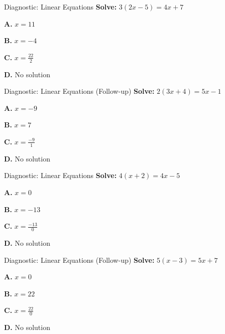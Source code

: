 \documentclass[12pt]{beamer}
\begin{document}
\begin{frame}{Diagnostic: Linear Equations}
\textbf{Solve:} $3(2x - 5) = 4x + 7$

\vspace{1cm}

\textbf{A.} $x = 11$ \hfill {}

\textbf{B.} $x = -4$

\textbf{C.} $x = \displaystyle\frac{22}{2}$

\textbf{D.} No solution
\end{frame}

\begin{frame}{Diagnostic: Linear Equations (Follow-up)}
\textbf{Solve:} $2(3x + 4) = 5x - 1$

\vspace{1cm}

\textbf{A.} $x = -9$ \hfill {}

\textbf{B.} $x = 7$

\textbf{C.} $x = \displaystyle\frac{-9}{1}$

\textbf{D.} No solution
\end{frame}

\begin{frame}{Diagnostic: Linear Equations}
\textbf{Solve:} $4(x + 2) = 4x - 5$

\vspace{1cm}

\textbf{A.} $x = 0$

\textbf{B.} $x = -13$

\textbf{C.} $x = \displaystyle\frac{-13}{0}$

\textbf{D.} No solution \hfill {}
\end{frame}

\begin{frame}{Diagnostic: Linear Equations (Follow-up)}
\textbf{Solve:} $5(x - 3) = 5x + 7$

\vspace{1cm}

\textbf{A.} $x = 0$

\textbf{B.} $x = 22$

\textbf{C.} $x = \displaystyle\frac{22}{0}$

\textbf{D.} No solution \hfill {}
\end{frame}
\end{document}
